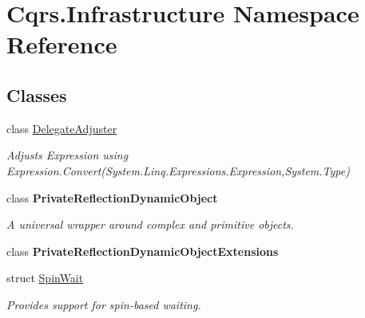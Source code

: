 \hypertarget{namespaceCqrs_1_1Infrastructure}{}\section{Cqrs.\+Infrastructure Namespace Reference}
\label{namespaceCqrs_1_1Infrastructure}
\subsection*{Classes}
\begin{DoxyCompactItemize}
\item 
class \hyperlink{classCqrs_1_1Infrastructure_1_1DelegateAdjuster}{Delegate\+Adjuster}
\begin{DoxyCompactList}\small\item\em Adjusts Expression using Expression.\+Convert(\+System.\+Linq.\+Expressions.\+Expression,\+System.\+Type) \end{DoxyCompactList}\item 
class {\bfseries Private\+Reflection\+Dynamic\+Object}
\begin{DoxyCompactList}\small\item\em A universal wrapper around complex and primitive objects. \end{DoxyCompactList}\item 
class {\bfseries Private\+Reflection\+Dynamic\+Object\+Extensions}
\item 
struct \hyperlink{structCqrs_1_1Infrastructure_1_1SpinWait}{Spin\+Wait}
\begin{DoxyCompactList}\small\item\em Provides support for spin-\/based waiting. \end{DoxyCompactList}\end{DoxyCompactItemize}
